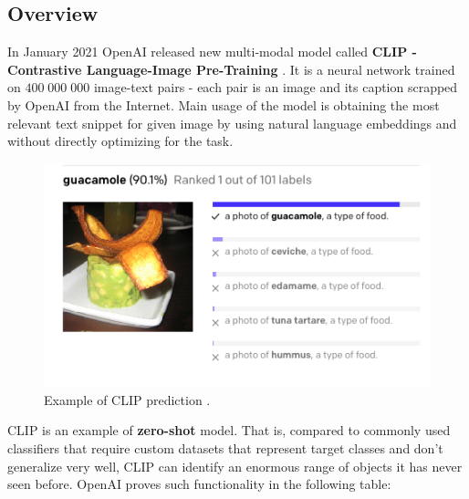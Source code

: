 \documentclass[11pt,a4paper,openany]{book}
\begin{document}
\subsection{Overview}
\noindent In January 2021 OpenAI released new multi-modal model called \textbf{CLIP - Contrastive Language-Image Pre-Training} \cite{clip}.  It is a neural network trained on $400 \;000 \;000$ image-text pairs - each pair is an image and its caption scrapped by OpenAI from the Internet. Main usage of the model is obtaining the most relevant text snippet for given image by using natural language embeddings and without directly optimizing for the task.
 \begin{figure}[ht!]
     \centering
     \includegraphics[scale=0.6]{figs/clip_example.png}
     \caption{Example of CLIP prediction \cite{clip_blog}.}
 \end{figure}
\noindent CLIP is an example of \textbf{zero-shot} model.  That is, compared to commonly used classifiers that require custom datasets that represent target classes and don't generalize very well, CLIP can identify an enormous range of objects it has never seen before. OpenAI proves such functionality in the following table:
\newline
\end{document}
